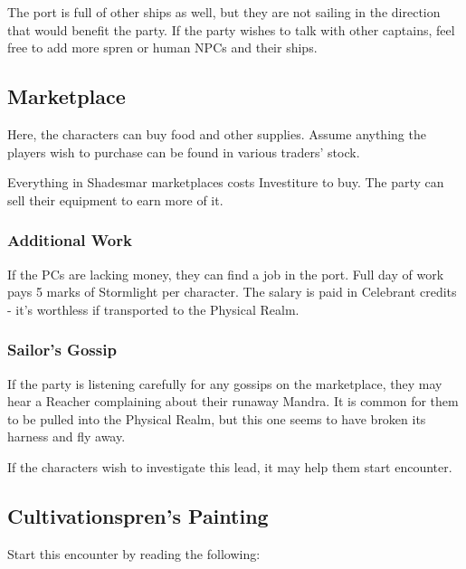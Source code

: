 The port is full of other ships as well, but they are not sailing in the direction that would benefit the party. If the party wishes to talk with other captains, feel free to add more spren or human NPCs and their ships.



\subsection{Marketplace}

Here, the characters can buy food and other supplies. Assume anything the players wish to purchase can be found in various traders' stock. 

Everything in Shadesmar marketplaces costs Investiture to buy. The party can sell their equipment to earn more of it.

\subsubsection{Additional Work}

If the PCs are lacking money, they can find a job in the port. Full day of work pays 5 marks of Stormlight per character. The salary is paid in Celebrant credits - it's worthless if transported to the Physical Realm.

\subsubsection{Sailor's Gossip}

If the party is listening carefully for any gossips on the marketplace, they may hear a Reacher complaining about their runaway Mandra. It is common for them to be pulled into the Physical Realm, but this one seems to have broken its harness and fly away.

If the characters wish to investigate this lead, it may help them start  encounter.



\subsection{Cultivationspren's Painting}
\label{ssec:celebrantPainter}

Start this encounter by reading the following:


